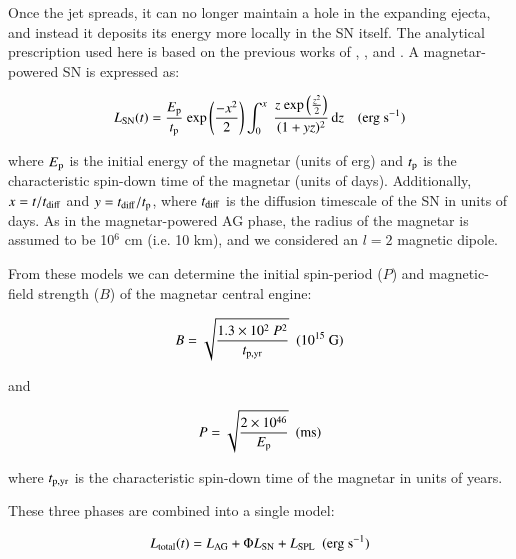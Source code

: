 \documentclass[traditabstract,longauth]{aa}
\begin{document}
\begin{appendix}
Once the jet spreads, it can no longer maintain a hole in the expanding ejecta, and instead it deposits its energy more locally in the SN itself.  The analytical prescription used here is based on the previous works of \citet{OstrikerGunn71}, \citet{KasenBild10}, \citet{Barkov11} and \citet{Chatzopoulos11}.  A magnetar-powered SN is expressed as:

\begin{equation}
 L_{\rm SN}(t) = \frac{E_{\rm p}}{t_{\rm p}}~{\rm exp}\left(\frac{-x^2}{2}\right)\int_0^x~\frac{z~{\rm exp}\left(\frac{z^2}{2}\right)}{(1+yz)^2}\, \mathrm{d}z \hspace{10pt} ({\rm erg~s^{-1}})
 \label{equ:mag_SN}
\end{equation}

\noindent where $E_{\rm p}$ is the initial energy of the magnetar (units of erg) and $t_{\rm p}$ is the characteristic spin-down time of the magnetar (units of days). Additionally, $x = t / t_{\rm diff}$ and $y = t_{\rm diff} / t_{\rm p}$, where $t_{\rm diff}$ is the diffusion timescale of the SN in units of days.  As in the magnetar-powered AG phase, the radius of the magnetar is assumed to be 10$^6$ cm (i.e. 10 km), and we considered an $l=2$ magnetic dipole.

From these models we can determine the initial spin-period ($P$) and magnetic-field strength ($B$) of the magnetar central engine:




\begin{equation}
B = \sqrt{\frac{1.3\times10^{2}~P^2}{t_{\rm p, yr}}} \hspace{5pt} ({\rm 10^{15}~G})
\label{equ:mag_SN_B}
\end{equation}

\noindent and

\begin{equation}
P = \sqrt{\frac{2\times10^{46}}{E_{\rm p}}} \hspace{5pt} ({\rm ms})
\label{equ:mag_SN_P}
\end{equation}

\noindent where $t_{\rm p, yr}$ is the characteristic spin-down time of the magnetar in units of years.

These three phases are combined into a single model:


\begin{equation}
 L_{\rm total} (t) = L_{\rm AG} + \Phi L_{\rm SN} + L_{\rm SPL}  \hspace{5pt} ({\rm erg~s^{-1}})
 \label{equ:mag_combined_norm_SN}
\end{equation}


\end{appendix}
\end{document}

